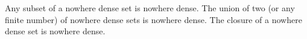 Any subset of a nowhere dense set is nowhere dense. The union of two (or any finite number) of nowhere dense sets is nowhere dense. The closure of a nowhere dense set is nowhere dense.
